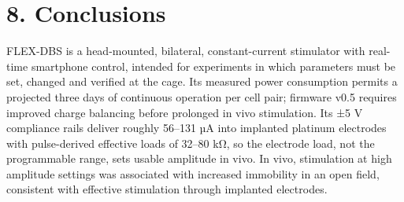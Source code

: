 \section{8. Conclusions}\label{conclusions}

FLEX-DBS is a head-mounted, bilateral, constant-current stimulator with real-time smartphone control, intended for experiments in which parameters must be set, changed and verified at the cage. Its measured power consumption permits a projected three days of continuous operation per cell pair; firmware v0.5 requires improved charge balancing before prolonged in vivo stimulation. Its ±5 V compliance rails deliver roughly 56--131 µA into implanted platinum electrodes with pulse-derived effective loads of 32--80 kΩ, so the electrode load, not the programmable range, sets usable amplitude in vivo. In vivo, stimulation at high amplitude settings was associated with increased immobility in an open field, consistent with effective stimulation through implanted electrodes.
